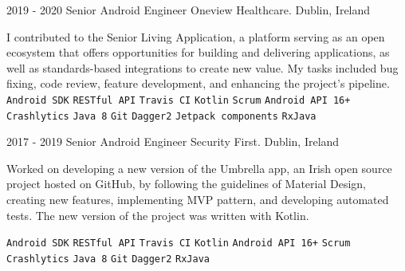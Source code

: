 \documentclass[9pt]{developercv} %
\begin{document}
\begin{entrylist}
	\entry
		{2019 -  2020}
		{Senior Android Engineer}
		{Oneview Healthcare. Dublin, Ireland}
{

I contributed to the Senior Living Application, a platform serving as an open ecosystem that offers opportunities for building and delivering applications, as well as standards-based integrations to create new value. My tasks included bug fixing, code review, feature development, and enhancing the project's pipeline.
\newline
 	{
 		\texttt{Android SDK}\slashsep
		 \texttt{RESTful API}\slashsep
		 \texttt{Travis CI}\slashsep
		 \texttt{Kotlin}\slashsep
		 \texttt{Scrum}\slashsep
		 \texttt{Android API 16+}\slashsep
		 \texttt{Crashlytics}\slashsep
		 \texttt{Java 8}\slashsep
		 \texttt{Git}\slashsep
		 \texttt{Dagger2}\slashsep
		 \texttt{Jetpack components}\slashsep
		 \texttt{RxJava}\slashsep
	}
}
\end{entrylist}
\begin{entrylist}
	\entry
		{2017 -  2019}
		{Senior Android Engineer}
		{Security First. Dublin, Ireland}
{
Worked on developing a new version of the Umbrella app, an Irish open source project hosted on GitHub, by following the guidelines of Material Design, creating new features, implementing MVP pattern, and developing automated tests. The new version of the project was written with Kotlin.

 	{
 		\texttt{Android SDK}\slashsep
		 \texttt{RESTful API}\slashsep
		 \texttt{Travis CI}\slashsep
		 \texttt{Kotlin}\slashsep
		 \texttt{Android API 16+}\slashsep
		 \texttt{Scrum}\slashsep
		 \texttt{Crashlytics}\slashsep
		 \texttt{Java 8}\slashsep
		 \texttt{Git}\slashsep
		 \texttt{Dagger2}\slashsep
		 \texttt{RxJava}\slashsep
	}
}
\end{entrylist}
\end{document}
